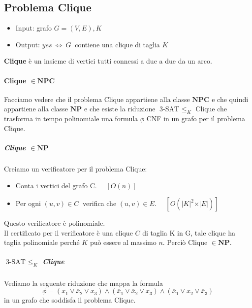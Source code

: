 \documentclass[a4paper]{article}
\theoremstyle{definition}
\newcommand{\np}{\mathbf{NP}}
\newcommand{\npc}{\mathbf{NPC}}
\begin{document}
	\subsection{Problema Clique}
		\begin{itemize}
			\item Input: grafo $ G = (V, E), K $
			\item Output: $ yes\ \Leftrightarrow \ G\ $ contiene una clique di taglia $ K $
		\end{itemize}
		\textbf{Clique} è un insieme di vertici tutti connessi a due a due da un arco.
		
		\bigskip
		
		\paragraph{Clique $ \in \npc $} Facciamo vedere che il problema Clique appartiene alla classe $ \npc $ e che quindi appartiene alla classe $ \np $ e che esiste la riduzione $ \text{3-SAT } \leq_K $ Clique che trasforma in tempo polinomiale una formula $ \phi $ CNF in un grafo per il problema  Clique.
		
		\subparagraph{Clique $ \in \np $} Creiamo un verificatore per il problema Clique:
		\begin{itemize}
			\item Conta i vertici del grafo C. $ \quad \left[ O(n) \right] $
			\item Per ogni $ (u, v) \in C \ $ verifica che $ (u, v) \in E $. 
			$ \quad \left[ O(\vert K \vert^2 \times \vert E \vert ) \right] $
		\end{itemize}
		Questo verificatore è polinomiale. \\
		Il certificato per il verificatore è una clique $ C $ di taglia K in G, tale clique ha taglia polinomiale perché $ K $ può essere al massimo $ n $. Perciò Clique $ \in \np $.
		
		\subparagraph{$ \text{3-SAT } \leq_K $ Clique} Vediamo la seguente riduzione che mappa la formula 
		\[
			\phi= (x_1\vee \overline{x}_2\vee x_3) \wedge (\overline{x}_1\vee \overline{x}_2\vee x_3) \wedge (\overline{x}_1\vee x_2\vee \overline{x}_3)
		\]
		in un grafo che soddisfa il problema Clique.
		
\end{document}

